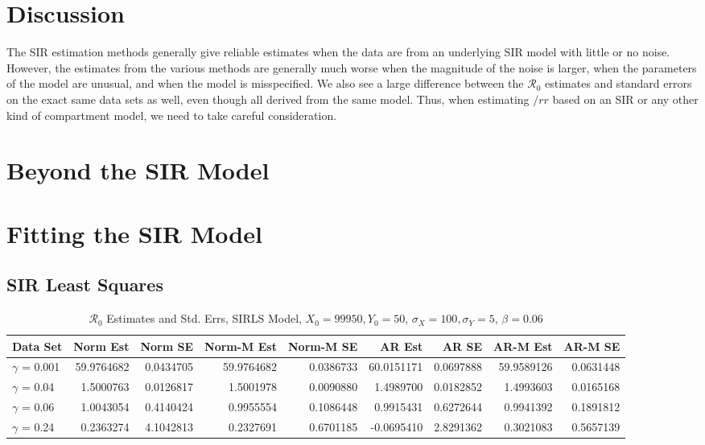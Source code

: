 \message{ !name(draft_v13.tex)}\documentclass[12pt]{article}
\newcommand{\rr}{\ensuremath{\mathcal{R}_0}}
\begin{document}
\section{Discussion}\label{sec:discussion}

The SIR estimation methods generally give reliable estimates when the data are from an underlying SIR model with little or no noise. However, the estimates from the various methods are generally much worse when the magnitude of the noise is larger, when the parameters of the model are unusual, and when the model is misspecified. We also see a large difference between the $\rr$ estimates and standard errors on the exact same data sets as well, even though all derived from the same model. Thus, when estimating $/rr$ based on an SIR or any other kind of compartment model, we need to take careful consideration.





\appendix

\section{Beyond the SIR Model}

\section{Fitting the SIR Model}

\subsection{SIR Least Squares}


\begin{table}[H]
	
	\caption{\label{tab:}$\rr$ Estimates and Std. Errs, SIRLS Model,
		$X_0 = 99950, Y_0 = 50$, $\sigma_X = 100, \sigma_Y = 5$, $\beta = 0.06$}
	\centering
	\begin{footnotesize}
		\begin{tabular}[t]{l|r|r|r|r|r|r|r|r}
			\hline
			Data Set & Norm Est & Norm SE & Norm-M Est & Norm-M SE & AR Est & AR SE & AR-M Est & AR-M SE\\
			\hline
			$\gamma$ = 0.001 & 59.9764682 & 0.0434705 & 59.9764682 & 0.0386733 & 60.0151171 & 0.0697888 & 59.9589126 & 0.0631448\\
			\hline
			$\gamma$ = 0.04 & 1.5000763 & 0.0126817 & 1.5001978 & 0.0090880 & 1.4989700 & 0.0182852 & 1.4993603 & 0.0165168\\
			\hline
			$\gamma$ = 0.06 & 1.0043054 & 0.4140424 & 0.9955554 & 0.1086448 & 0.9915431 & 0.6272644 & 0.9941392 & 0.1891812\\
			\hline
			$\gamma$ = 0.24 & 0.2363274 & 4.1042813 & 0.2327691 & 0.6701185 & -0.0695410 & 2.8291362 & 0.3021083 & 0.5657139\\
			\hline
		\end{tabular}
	\end{footnotesize}
\end{table}
\end{document}
